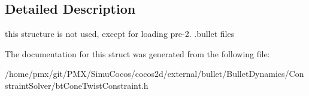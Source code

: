 \subsection{Detailed Description}
this structure is not used, except for loading pre-\/2. .bullet files 

The documentation for this struct was generated from the following file\+:\begin{DoxyCompactItemize}
\item 
/home/pmx/git/\+P\+M\+X/\+Simu\+Cocos/cocos2d/external/bullet/\+Bullet\+Dynamics/\+Constraint\+Solver/bt\+Cone\+Twist\+Constraint.\+h\end{DoxyCompactItemize}
